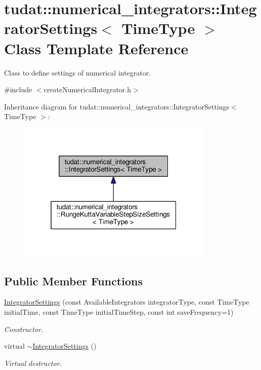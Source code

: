 \hypertarget{classtudat_1_1numerical__integrators_1_1IntegratorSettings}{}\section{tudat\+:\+:numerical\+\_\+integrators\+:\+:Integrator\+Settings$<$ Time\+Type $>$ Class Template Reference}
\label{classtudat_1_1numerical__integrators_1_1IntegratorSettings}


Class to define settings of numerical integrator.  




{\ttfamily \#include $<$create\+Numerical\+Integrator.\+h$>$}



Inheritance diagram for tudat\+:\+:numerical\+\_\+integrators\+:\+:Integrator\+Settings$<$ Time\+Type $>$\+:
\nopagebreak
\begin{figure}[H]
\begin{center}
\leavevmode
\includegraphics[width=265pt]{classtudat_1_1numerical__integrators_1_1IntegratorSettings__inherit__graph}
\end{center}
\end{figure}
\subsection*{Public Member Functions}
\begin{DoxyCompactItemize}
\item 
\hyperlink{classtudat_1_1numerical__integrators_1_1IntegratorSettings_af56614ece02c8164a8d38be6492ac925}{Integrator\+Settings} (const Available\+Integrators integrator\+Type, const Time\+Type initial\+Time, const Time\+Type initial\+Time\+Step, const int save\+Frequency=1)
\begin{DoxyCompactList}\small\item\em Constructor. \end{DoxyCompactList}\item 
virtual \hyperlink{classtudat_1_1numerical__integrators_1_1IntegratorSettings_a6a21fbb1e84dcf6d3c1c2cac225d2d34}{$\sim$\+Integrator\+Settings} ()
\begin{DoxyCompactList}\small\item\em Virtual destructor. \end{DoxyCompactList}\end{DoxyCompactItemize}

